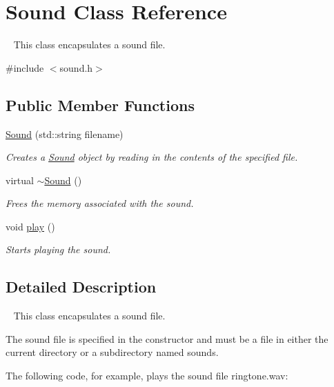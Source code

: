 \hypertarget{classSound}{}\section{Sound Class Reference}
\label{classSound}


~\newline
 This class encapsulates a sound file.  




{\ttfamily \#include $<$sound.\+h$>$}

\subsection*{Public Member Functions}
\begin{DoxyCompactItemize}
\item 
\mbox{\hyperlink{classSound_abc4f1c2a277d6731194905a54294c7ba}{Sound}} (std\+::string filename)
\begin{DoxyCompactList}\small\item\em Creates a {\ttfamily \mbox{\hyperlink{classSound}{Sound}}} object by reading in the contents of the specified file. \end{DoxyCompactList}\item 
virtual \mbox{\hyperlink{classSound_ac34f0a5b7e2e11c053df62714aff04fa}{$\sim$\+Sound}} ()
\begin{DoxyCompactList}\small\item\em Frees the memory associated with the sound. \end{DoxyCompactList}\item 
void \mbox{\hyperlink{classSound_a6d58098c6cf63c241ed03bc797256bb1}{play}} ()
\begin{DoxyCompactList}\small\item\em Starts playing the sound. \end{DoxyCompactList}\end{DoxyCompactItemize}


\subsection{Detailed Description}
~\newline
 This class encapsulates a sound file. 

The sound file is specified in the constructor and must be a file in either the current directory or a subdirectory named {\ttfamily sounds}.

The following code, for example, plays the sound file {\ttfamily ringtone.\+wav}\+:


